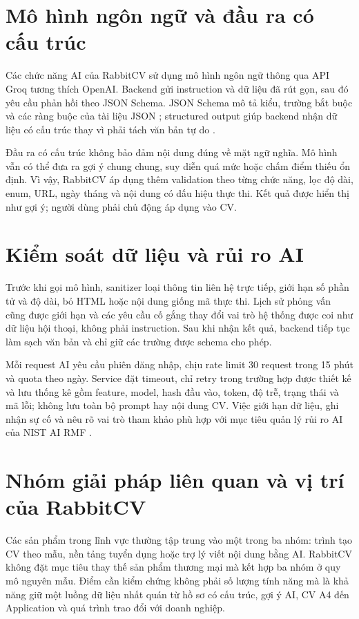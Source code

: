 \section{Mô hình ngôn ngữ và đầu ra có cấu trúc}

Các chức năng AI của RabbitCV sử dụng mô hình ngôn ngữ thông qua API Groq tương thích OpenAI. Backend gửi instruction và dữ liệu đã rút gọn, sau đó yêu cầu phản hồi theo JSON Schema. JSON Schema mô tả kiểu, trường bắt buộc và các ràng buộc của tài liệu JSON \cite{jsonschema}; structured output giúp backend nhận dữ liệu có cấu trúc thay vì phải tách văn bản tự do \cite{groqstructured}.

Đầu ra có cấu trúc không bảo đảm nội dung đúng về mặt ngữ nghĩa. Mô hình vẫn có thể đưa ra gợi ý chung chung, suy diễn quá mức hoặc chấm điểm thiếu ổn định. Vì vậy, RabbitCV áp dụng thêm validation theo từng chức năng, lọc độ dài, enum, URL, ngày tháng và nội dung có dấu hiệu thực thi. Kết quả được hiển thị như gợi ý; người dùng phải chủ động áp dụng vào CV.

\section{Kiểm soát dữ liệu và rủi ro AI}

Trước khi gọi mô hình, sanitizer loại thông tin liên hệ trực tiếp, giới hạn số phần tử và độ dài, bỏ HTML hoặc nội dung giống mã thực thi. Lịch sử phỏng vấn cũng được giới hạn và các yêu cầu cố gắng thay đổi vai trò hệ thống được coi như dữ liệu hội thoại, không phải instruction. Sau khi nhận kết quả, backend tiếp tục làm sạch văn bản và chỉ giữ các trường được schema cho phép.

Mỗi request AI yêu cầu phiên đăng nhập, chịu rate limit 30 request trong 15 phút và quota theo ngày. Service đặt timeout, chỉ retry trong trường hợp được thiết kế và lưu thống kê gồm feature, model, hash đầu vào, token, độ trễ, trạng thái và mã lỗi; không lưu toàn bộ prompt hay nội dung CV. Việc giới hạn dữ liệu, ghi nhận sự cố và nêu rõ vai trò tham khảo phù hợp với mục tiêu quản lý rủi ro AI của NIST AI RMF \cite{nistairmf}.

\section{Nhóm giải pháp liên quan và vị trí của RabbitCV}

Các sản phẩm trong lĩnh vực thường tập trung vào một trong ba nhóm: trình tạo CV theo mẫu, nền tảng tuyển dụng hoặc trợ lý viết nội dung bằng AI. RabbitCV không đặt mục tiêu thay thế sản phẩm thương mại mà kết hợp ba nhóm ở quy mô nguyên mẫu. Điểm cần kiểm chứng không phải số lượng tính năng mà là khả năng giữ một luồng dữ liệu nhất quán từ hồ sơ có cấu trúc, gợi ý AI, CV A4 đến Application và quá trình trao đổi với doanh nghiệp.

